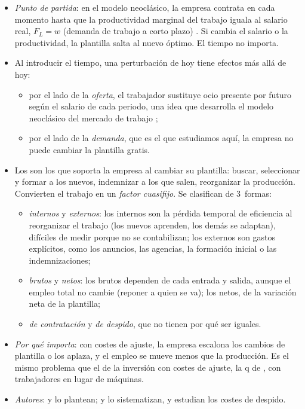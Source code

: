 \documentclass[11pt]{article}
\begin{document}
\begin{itemize}
\item \emph{Punto de partida}: en el modelo neoclásico, la empresa contrata en cada momento hasta que la productividad marginal del trabajo iguala al salario real, $F_L=w$ (demanda de trabajo a corto plazo) . Si cambia el salario o la productividad, la plantilla salta al nuevo óptimo. El tiempo no importa.
\item Al introducir el tiempo, una perturbación de hoy tiene efectos más allá de hoy:
  \begin{itemize}
  \item por el lado de la \emph{oferta}, el trabajador sustituye ocio presente por futuro según el salario de cada periodo\nocite{LucasRapping1969Real}, una idea que desarrolla el modelo neoclásico del mercado de trabajo ;
  \item por el lado de la \emph{demanda}, que es el que estudiamos aquí, la empresa no puede cambiar la plantilla gratis.
  \end{itemize}
\item Los  son los que soporta la empresa al cambiar su plantilla: buscar, seleccionar y formar a los nuevos, indemnizar a los que salen, reorganizar la producción. Convierten el trabajo en un \emph{factor cuasifijo}\nocite{Oi1962Labor}. Se clasifican de 3~formas:
  \begin{itemize}
  \item \emph{internos} y \emph{externos}: los internos son la pérdida temporal de eficiencia al reorganizar el trabajo (los nuevos aprenden, los demás se adaptan), difíciles de medir porque no se contabilizan; los externos son gastos explícitos, como los anuncios, las agencias, la formación inicial o las indemnizaciones;
  \item \emph{brutos} y \emph{netos}: los brutos dependen de cada entrada y salida, aunque el empleo total no cambie (reponer a quien se va); los netos, de la variación neta de la plantilla\nocite{Cahuc2014Labor};
  \item \emph{de contratación} y \emph{de despido}, que no tienen por qué ser iguales.
  \end{itemize}
\item \emph{Por qué importa}: con costes de ajuste, la empresa escalona los cambios de plantilla o los aplaza, y el empleo se mueve menos que la producción. Es el mismo problema que el de la inversión con costes de ajuste, la q de  , con trabajadores en lugar de máquinas.
\item \emph{Autores}: \textcite{Oi1962Labor} y \textcite{HoltEtAl1960Planning} lo plantean; \textcite{Nickell1986Dynamic} y \textcite{Hamermesh1993Labor} lo sistematizan, y \textcite{BentolilaBertola1990Firing} estudian los costes de despido.
\end{itemize}
\end{document}
